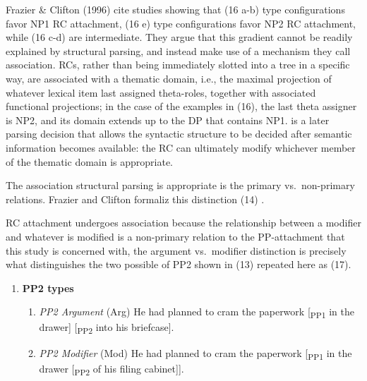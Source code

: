 \documentclass[12pt,oneside]{book}
\providecommand{\tightlist}{%
  \setlength{\itemsep}{0pt}\setlength{\parskip}{0pt}}
\begin{document}
Frazier \& Clifton (1996) cite studies showing that (16 a-b) type configurations favor NP1 RC attachment, (16 e) type configurations favor NP2 RC attachment, while (16 c-d) are intermediate. They argue that this gradient cannot be readily explained by structural parsing, and instead  make use of a mechanism they call association. RCs, rather than being immediately slotted into a tree in a specific way, are associated with a thematic domain, i.e., the maximal projection of whatever lexical item last assigned theta-roles, together with associated functional projections; in the case of the examples in (16), the last theta assigner is NP2, and its domain extends up to the DP that contains NP1.  is a later parsing decision that allows the syntactic structure to be decided after semantic information becomes available: the RC can ultimately modify whichever member of the thematic domain is appropriate.

The  association  structural parsing is appropriate is the  primary vs.~non-primary relations. Frazier and Clifton formaliz this distinction   (14) . 

RC attachment undergoes association because  the relationship between a modifier and whatever is modified is a non-primary relation  to the PP-attachment  that this study is concerned with, the argument vs.~modifier distinction is precisely what distinguishes the two possible  of PP2 shown  in (13) repeated here as (17).

\begin{enumerate}
\def\labelenumi{(\arabic{enumi})}
\setcounter{enumi}{16}
\tightlist
\item
  \textbf{PP2 types}

  \begin{enumerate}
  \def\labelenumii{(\alph{enumii})}
  \tightlist
  \item
    \emph{PP2 Argument} (Arg)
    He had planned to cram the paperwork {[}\textsubscript{PP1} in the drawer{]} {[}\textsubscript{PP2} into his briefcase{]}.
  \item
    \emph{PP2 Modifier} (Mod)
    He had planned to cram the paperwork {[}\textsubscript{PP1} in the drawer {[}\textsubscript{PP2} of his filing cabinet{]}{]}.
  \end{enumerate}
\end{enumerate}
\end{document}
